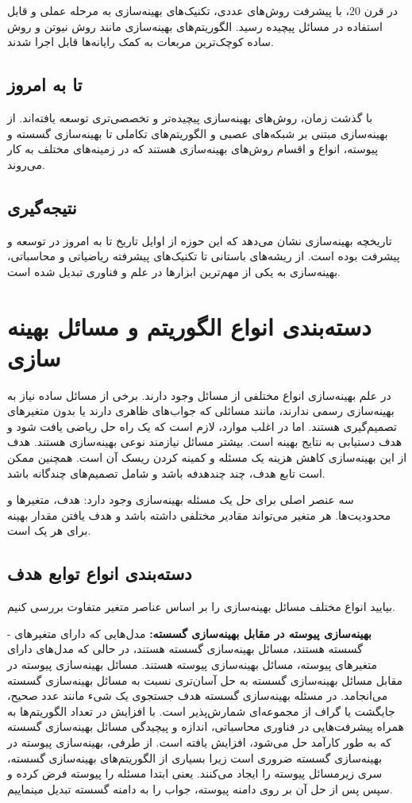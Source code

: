در قرن 20، با پیشرفت روش‌های عددی، تکنیک‌های بهینه‌سازی به مرحله عملی و قابل استفاده در مسائل پیچیده رسید. الگوریتم‌های بهینه‌سازی مانند روش نیوتن و روش ساده کوچک‌ترین مربعات به کمک رایانه‌ها قابل اجرا شدند.

\subsection{تا به امروز}

با گذشت زمان، روش‌های بهینه‌سازی پیچیده‌تر و تخصصی‌تری توسعه یافته‌اند. از بهینه‌سازی مبتنی بر شبکه‌های عصبی و الگوریتم‌های تکاملی تا بهینه‌سازی گسسته و پیوسته، انواع و اقسام روش‌های بهینه‌سازی هستند که در زمینه‌های مختلف به کار می‌روند.

\subsection{نتیجه‌گیری}

تاریخچه بهینه‌سازی نشان می‌دهد که این حوزه از اوایل تاریخ تا به امروز در توسعه و پیشرفت بوده است. از ریشه‌های باستانی تا تکنیک‌های پیشرفته ریاضیاتی و محاسباتی، بهینه‌سازی به یکی از مهم‌ترین ابزارها در علم و فناوری تبدیل شده است.
\section{دسته‌بندی انواع الگوریتم و مسائل بهینه سازی}

در علم بهینه‌سازی انواع مختلفی از مسائل وجود دارند. برخی از مسائل ساده نیاز به بهینه‌سازی رسمی ندارند، مانند مسائلی که جواب‌های ظاهری دارند یا بدون متغیرهای تصمیم‌گیری هستند. اما در اغلب موارد، لازم است که یک راه حل ریاضی یافت شود و هدف دستیابی به نتایج بهینه است. بیشتر مسائل نیازمند نوعی بهینه‌سازی هستند. هدف از این بهینه‌سازی کاهش هزینه یک مسئله و کمینه کردن ریسک آن است. همچنین ممکن است تابع هدف، چند چند‌هدفه باشد و شامل تصمیم‌های چندگانه باشد.


سه عنصر اصلی برای حل یک مسئله بهینه‌سازی وجود دارد: هدف، متغیرها و محدودیت‌ها. هر متغیر می‌تواند مقادیر مختلفی داشته باشد و هدف یافتن مقدار بهینه برای هر یک است.
\subsection{
دسته‌بندی انواع توابع هدف
}
بیایید انواع مختلف مسائل بهینه‌سازی را بر اساس عناصر متغیر متفاوت بررسی کنیم.

- \textbf{بهینه‌سازی پیوسته در مقابل بهینه‌سازی گسسته:}
مدل‌هایی که دارای متغیرهای گسسته هستند، مسائل بهینه‌سازی گسسته هستند، در حالی که مدل‌های دارای متغیرهای پیوسته، مسائل بهینه‌سازی پیوسته هستند. مسائل بهینه‌سازی پیوسته در مقابل مسائل بهینه‌سازی گسسته به حل آسان‌تری نسبت به مسائل بهینه‌سازی گسسته می‌انجامد. در مسئله بهینه‌سازی گسسته هدف جستجوی یک شیء مانند عدد صحیح، جایگشت یا گراف از مجموعه‌ای شمارش‌پذیر است. با افزایش در تعداد الگوریتم‌ها به همراه پیشرفت‌هایی در فناوری محاسباتی، اندازه و پیچیدگی مسائل بهینه‌سازی گسسته که به طور کارآمد حل می‌شود، افزایش یافته است. از طرفی، بهینه‌سازی پیوسته در بهینه‌سازی گسسته ضروری است زیرا بسیاری از الگوریتم‌های بهینه‌سازی گسسته، سری زیر‌مسائل پیوسته را ایجاد می‌کنند. یعنی ابتدا مسئله را پیوسته فرض کرده و سپس پس از حل آن بر روی دامنه پیوسته، جواب را به دامنه گسسته تبدیل مینماییم.

